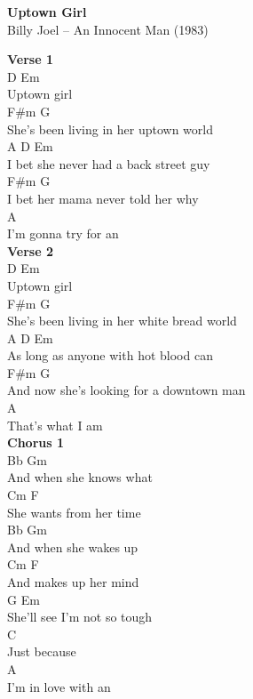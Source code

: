 \documentclass[a4paper]{article}
\begin{document}
    \begin{center}
        \textbf{Uptown Girl}
        ~\\
        Billy Joel -- An Innocent Man (1983)
    \end{center}
    {
        \scriptsize
        \textbf{Verse 1}
        ~\\
        {
            \cutive
            \obeyspaces
D           Em
\\
Uptown girl
\\
                         F\#m           G
\\
She's been living in her uptown world
\\
          A           D               Em
\\
I bet she never had a back street guy
\\
                     F\#m           G
\\
I bet her mama never told her why
\\
          A
\\
I'm gonna try for an
\\

        }
        \textbf{Verse 2}
        ~\\
        {
            \cutive
            \obeyspaces
D           Em
\\
Uptown girl
\\
                         F\#m                G
\\
She's been living in her white bread world
\\
           A           D              Em
\\
As long as anyone with hot blood can
\\
                            F\#m            G
\\
And now she's looking for a downtown man
\\
              A
\\
That's what I am
\\

        }
        \textbf{Chorus 1}
        ~\\
        {
            \cutive
            \obeyspaces
Bb           Gm
\\
And when she knows what
\\
    Cm             F
\\
She wants from her time
\\
Bb           Gm
\\
And when she wakes up
\\
    Cm           F
\\
And makes up her mind
\\
G              Em
\\
She'll see I'm not so tough
\\
C
\\
Just because
\\
A
\\
I'm in love with an
\\

}}
\end{document}
